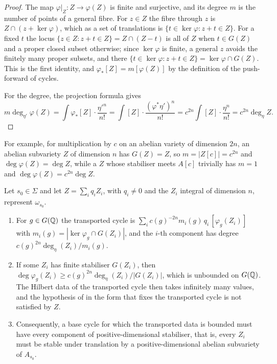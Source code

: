 \begin{proof}
The map $\varphi|_{Z}\colon Z\to\varphi(Z)$ is finite and surjective, and its
degree $m$ is the number of points of a general fibre. For $z\in Z$ the fibre
through $z$ is $Z\cap(z+\ker\varphi)$, which as a set of translations is
$\{t\in\ker\varphi:z+t\in Z\}$. For a fixed $t$ the locus
$\{z\in Z:z+t\in Z\}=Z\cap(Z-t)$ is all of $Z$ when $t\in G(Z)$ and a proper
closed subset otherwise; since $\ker\varphi$ is finite, a general $z$ avoids
the finitely many proper subsets, and there
$\{t\in\ker\varphi:z+t\in Z\}=\ker\varphi\cap G(Z)$. This is the first
identity, and $\varphi_{*}[Z]=m[\varphi(Z)]$ by the definition of the
push-forward of cycles.

For the degree, the projection formula gives
\[
  m\deg_{\eta'}\varphi(Z)=\int\varphi_{*}[Z]\cdot\frac{\eta'^{n}}{n!}
  =\int[Z]\cdot\frac{(\varphi^{*}\eta')^{n}}{n!}
  =c^{2n}\int[Z]\cdot\frac{\eta^{n}}{n!}=c^{2n}\deg_{\eta}Z .
\]
\end{proof}

For example, for multiplication by $c$ on an abelian variety of dimension $2n$,
an abelian subvariety $Z$ of dimension $n$ has $G(Z)=Z$, so $m=|Z[c]|=c^{2n}$
and $\deg\varphi(Z)=\deg Z$, while a $Z$ whose stabiliser meets $A[c]$
trivially has $m=1$ and $\deg\varphi(Z)=c^{2n}\deg Z$.

\begin{theorem}\label{thm:p1forces}
Let $s_{0}\in\Sigma$ and let $Z=\sum_{i}q_{i}Z_{i}$, with $q_{i}\ne0$ and the
$Z_{i}$ integral of dimension $n$, represent $\omega_{s_{0}}$.
\begin{enumerate}[label=\textup{(\roman*)},leftmargin=2.6em,itemsep=2pt]
\item For $g\in G(\mathbb{Q})$ the transported cycle is
  $\sum_{i}c(g)^{-2n}m_{i}(g)\,q_{i}\,[\varphi_{g}(Z_{i})]$ with
  $m_{i}(g)=|\ker\varphi_{g}\cap G(Z_{i})|$, and the $i$-th component has
  degree $c(g)^{2n}\deg_{\eta}(Z_{i})/m_{i}(g)$.
\item If some $Z_{i}$ has finite stabiliser $G(Z_{i})$, then
  $\deg\varphi_{g}(Z_{i})\ge c(g)^{2n}\deg_{\eta}(Z_{i})/|G(Z_{i})|$, which is
  unbounded on $G(\mathbb{Q})$. The Hilbert data of the transported cycle then takes
  infinitely many values, and the hypothesis of  in the
  form that fixes the transported cycle is not satisfied by $Z$.
\item Consequently, a base cycle for which the transported data is bounded
  must have every component of positive-dimensional stabiliser, that is, every
  $Z_{i}$ must be stable under translation by a positive-dimensional abelian
  subvariety of $A_{s_{0}}$.
\end{enumerate}
\end{theorem}


